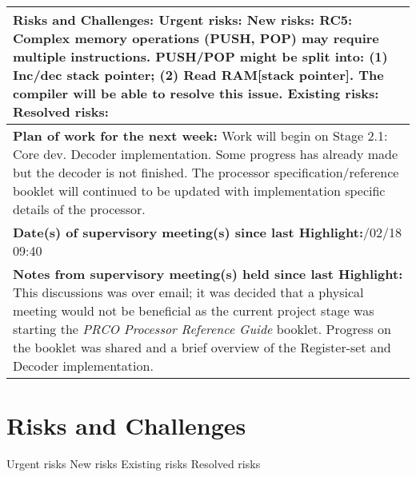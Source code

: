 \documentclass[11pt,a4paper]{article}
\begin{document}
\begin{table}[H]
\begin{tabularx}{\textwidth}{|X|}
	\\ \hline
	\textbf{Risks and Challenges:}\newline
	{\color{red} Urgent risks:}\newline
	{\color{orange} New risks:\newline
	RC5: Complex memory operations (PUSH, POP) may require multiple instructions. PUSH/POP might be split into: (1) Inc/dec stack pointer; (2) Read RAM[stack pointer]. The compiler will be able to resolve this issue.}\newline
	{\color{purple} Existing risks:}\newline
	{\color{gray} Resolved risks:}\newline
	\\ \hline
	\textbf{Plan of work for the next week:}\newline
	Work will begin on Stage 2.1: Core dev. Decoder implementation.\newline\newline
	Some progress has already made but the decoder is not finished.
	\newline
	The processor specification/reference booklet will continued to be updated with implementation specific details of the processor.
	\\ \hline
	\textbf{Date(s) of supervisory meeting(s) since last Highlight:}\newline
	13/02/18 09:40
	\\ \hline
	\textbf{Notes from supervisory meeting(s) held since last Highlight:}\newline
	This discussions was over email; it was decided that a physical meeting would not be beneficial as the current project stage was starting the \textit{PRCO Processor Reference Guide} booklet. Progress on the booklet was shared and a brief overview of the {\color{ballblue}Register-set} and {\color{ballblue}Decoder} implementation.
	\\ \hline
    \end{tabularx}
\end{table}

\newpage
\section{Risks and Challenges}
{\color{red} Urgent risks}\newline
{\color{orange} New risks}\newline
{\color{purple} Existing risks}\newline
{\color{gray} Resolved risks}
\end{document}

